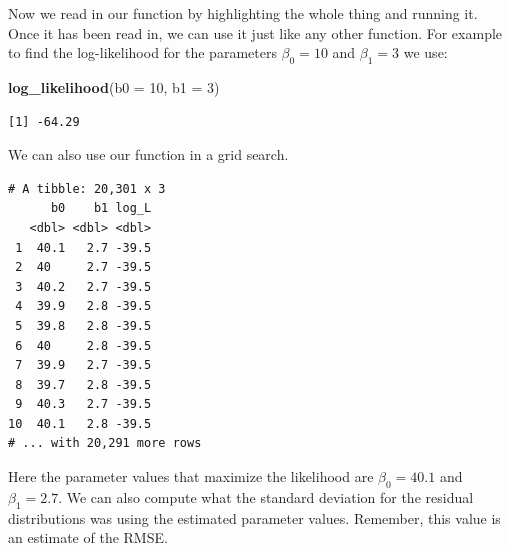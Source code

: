\documentclass[]{book}
\newenvironment{Shaded}{\begin{snugshade}}{\end{snugshade}}
\newcommand{\DataTypeTok}[1]{\textcolor[rgb]{0.13,0.29,0.53}{#1}}
\newcommand{\DecValTok}[1]{\textcolor[rgb]{0.00,0.00,0.81}{#1}}
\newcommand{\FloatTok}[1]{\textcolor[rgb]{0.00,0.00,0.81}{#1}}
\newcommand{\KeywordTok}[1]{\textcolor[rgb]{0.13,0.29,0.53}{\textbf{#1}}}
\newcommand{\NormalTok}[1]{#1}
\newcommand{\OperatorTok}[1]{\textcolor[rgb]{0.81,0.36,0.00}{\textbf{#1}}}
\newcommand{\StringTok}[1]{\textcolor[rgb]{0.31,0.60,0.02}{#1}}
\begin{document}
Now we read in our function by highlighting the whole thing and running it. Once it has been read in, we can use it just like any other function. For example to find the log-likelihood for the parameters \(\beta_0=10\) and \(\beta_1=3\) we use:

\begin{Shaded}
\begin{Highlighting}[]
\KeywordTok{log_likelihood}\NormalTok{(}\DataTypeTok{b0 =} \DecValTok{10}\NormalTok{, }\DataTypeTok{b1 =} \DecValTok{3}\NormalTok{)}
\end{Highlighting}
\end{Shaded}

\begin{verbatim}
[1] -64.29
\end{verbatim}

We can also use our function in a grid search.

\begin{Shaded}
\end{Shaded}

\begin{verbatim}
# A tibble: 20,301 x 3
      b0    b1 log_L
   <dbl> <dbl> <dbl>
 1  40.1   2.7 -39.5
 2  40     2.7 -39.5
 3  40.2   2.7 -39.5
 4  39.9   2.8 -39.5
 5  39.8   2.8 -39.5
 6  40     2.8 -39.5
 7  39.9   2.7 -39.5
 8  39.7   2.8 -39.5
 9  40.3   2.7 -39.5
10  40.1   2.8 -39.5
# ... with 20,291 more rows
\end{verbatim}

Here the parameter values that maximize the likelihood are \(\beta_0 = 40.1\) and \(\beta_1=2.7\). We can also compute what the standard deviation for the residual distributions was using the estimated parameter values. Remember, this value is an estimate of the RMSE.
\end{document}
